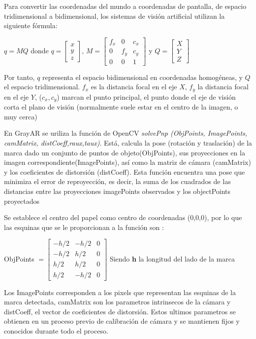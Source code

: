 Para convertir las coordenadas del mundo a coordenadas de pantalla, de espacio tridimensional a bidimensional, los sistemas de visión artificial utilizan la siguiente fórmula:

\begin{center}
$q=MQ$ donde $q=\begin{bmatrix} x \\ y \\ z \end{bmatrix}$, $M=\begin{bmatrix} f_{x} & 0 & c_{x} \\ 0 & f_{y} & c_{y} \\ 0 & 0 & 1 \end{bmatrix}$ y $Q=\begin{bmatrix} X \\ Y \\ Z \end{bmatrix}$
\end{center}

Por tanto, $q$ representa el espacio bidimensional en coordenadas homogéneas, y $Q$ el espacio tridimensional. $f_{x}$ es la distancia focal en el eje $X$, $f_{y}$ la distancia focal en el eje $Y$, ($c_{x},c_{y}$) marcan el punto principal, el punto donde el eje de visión corta el plano de visión (normalmente suele estar en el centro de la imagen, o muy cerca) 

En GrayAR se uriliza la función de OpenCV \textit{solvePnp (ObjPoints, ImagePoints, camMatrix, distCoeff,raux,taux)}.   Está, calcula la pose (rotación y traslación) de la marca dado un conjunto de puntos de objeto(ObjPoints), sus proyecciones en la imagen correspondiente(ImagePoints), así como la matriz de cámara (camMatrix) y los coeficientes de distorsión (distCoeff). Esta función encuentra una pose que minimiza el error de reproyección, es decir, la suma de los cuadrados de las distancias entre las proyecciones imagePoints observados y los objectPoints proyectados

Se establece el centro del papel como centro de coordenadas (0,0,0), por lo que las esquinas que se le proporcionan a la función son :
\begin{center}
ObjPoints $=\begin{bmatrix} -h/2 & -h/2 & 0 \\
                 -h/2 &  h/2 & 0 \\
                  h/2 &  h/2 & 0 \\
                  h/2 & -h/2 & 0   
\end{bmatrix}$
Siendo \textbf{h} la longitud del lado de la marca
\end{center}
Los ImagePoints corresponden a los pixels que representan las esquinas de la marca detectada, camMatrix son los parametros intrinsecos de la cámara y distCoeff, el vector de coeficientes de distorsión. Estos ultimos parametros se obtienen  en un proceso previo de calibración de cámara y se mantienen fijos y conocidos durante todo el proceso.


